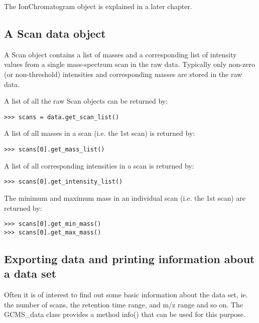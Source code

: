 \noindent
The IonChromatogram object is explained in a later chapter.

\subsection{A Scan data object}

A Scan object contains a list of masses and a corresponding list of intensity
values from a single mass-spectrum scan in the raw data. Typically only
non-zero (or non-threshold) intensities and corresponding masses are stored in
the raw data.


A list of all the raw Scan objects can be returned by:

\begin{verbatim}
>>> scans = data.get_scan_list()
\end{verbatim}

A list of all masses in a scan (i.e. the 1st scan) is returned by:

\begin{verbatim}
>>> scans[0].get_mass_list()
\end{verbatim}

A list of all corresponding intensities in a scan is returned by:

\begin{verbatim}
>>> scans[0].get_intensity_list()
\end{verbatim}

The minimum and maximum mass in an individual scan (i.e. the 1st scan) are
returned by:

\begin{verbatim}
>>> scans[0].get_min_mass()
>>> scans[0].get_max_mass()
\end{verbatim}

\subsection{Exporting data and printing information about a data set}


Often it is of interest to find out some basic information about the
data set, ie. the number of scans, the retention time range, and
m/z range and so on. The GCMS\_data class provides a method info()
that can be used for this purpose.

